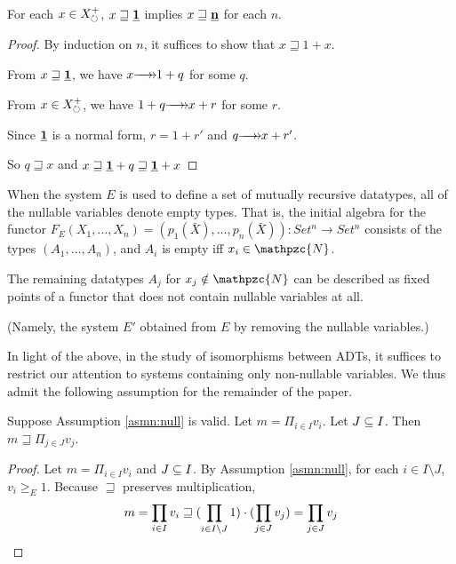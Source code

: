 \documentclass[numbers=enddot]{scrartcl}
\newcommand{\nullX}{\mathpzc{N}}
\newcommand{\gtE}{\geq_E}
\newcommand{\cov}{\sqsupseteq}
\newcommand{\const}[1]{\ul{\mathbf{#1}}}
\begin{document}
\begin{prop} \label{p:xcovn}
  For each $x \in X_{\circlearrowright}^+$, $x \cov \const 1$ implies $x \cov \const{n}$ for each $n$.
\end{prop}
\begin{proof} By induction on $n$, it suffices to show that $x \cov 1 + x$.

  From $x \cov \const{1}$, we have $x \thra 1 + q$ for some $q$.
 
  From $x \in X_{\circlearrowright}^+$, we have $1 + q \thra x + r$ for some $r$.

  Since $\const{1}$ is a normal form, $r = 1 + r'$ and $q \thra x + r'$.

  So $q \cov x$ and $x \cov \const{1} + q \cov \const{1} + x$
\end{proof}


When the system $E$ is used to define a set of mutually recursive datatypes,
all of the nullable variables denote empty types.  That is, the initial algebra
for the functor $F_E(X_1,\dots,X_n) = (p_1(\bar X), \dots,p_n(\bar X)) :
Set^n \to Set^n$ consists of the types $(A_1,\dots,A_n)$, and
$A_i$ is empty iff $x_i \in \nullX$.

The remaining datatypes $A_j$ for $x_j \notin \nullX$ can be described
as fixed points of a functor that does not contain nullable variables at all.

(Namely, the system $E'$ obtained from $E$ by removing the nullable variables.)

In light of the above, in the study of isomorphisms between ADTs,
it suffices to restrict our attention to systems containing only non-nullable
variables. We thus admit the following assumption for the remainder of the paper.

\begin{asmn}
  \label{asmn:null}
   \fbox{$\nullX = \emptyset$}
 \end{asmn}


\begin{lemma}\label{l:sse-mon-cov} Suppose Assumption \ref{asmn:null} is valid.
    Let $m = \Pi_{i \in I}v_i$.
    Let $J \subseteq I$.  Then $m \cov \Pi_{j \in J} v_j$.
\end{lemma}
\begin{proof}
    Let $m = \Pi_{i \in I}v_i$ and $J \subseteq I$.  By Assumption \ref{asmn:null}, for each $i \in I \setminus J$, $v_i \gtE 1$.  Because $\cov$ preserves multiplication, 
    \[ m = \prod_{i \in I}v_i \cov (\prod_{i \in I \setminus J}1) \cdot (\prod_{j \in J} v_j) = \prod_{j \in J} v_j \qedhere \]
\end{proof}
\end{document}
